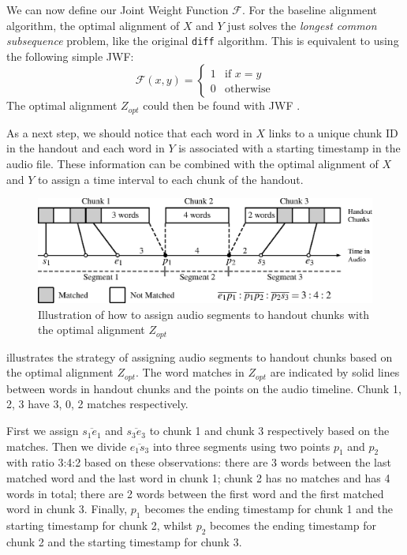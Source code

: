 We can now define our Joint Weight Function $\mathcal{F}$. For the baseline alignment algorithm, the optimal alignment of $X$ and $Y$ just solves the \textit{longest common subsequence} problem, like the original \texttt{diff} algorithm. This is equivalent to using the following simple JWF:
\begin{equation}
  \mathcal{F}(x,y) = 
  \begin{cases}
    1 & \text{if } x = y\\
    0 & \text{otherwise}
  \end{cases}
  \label{eq:jwf-baseline}
\end{equation}
The optimal alignment $Z_{opt}$ could then be found with JWF .

As a next step, we should notice that each word in $X$ links to a unique chunk ID in the handout and each word in $Y$ is associated with a starting timestamp in the audio file. These information can be combined with the optimal alignment of $X$ and $Y$ to assign a time interval to each chunk of the handout.

\begin{figure}[!tb]
  \centering
  \includegraphics[width=.9\textwidth]{align-algo-fig.eps}
  \caption{Illustration of how to assign audio segments to handout chunks with the optimal alignment $Z_{opt}$}
  \label{fig:align-algo-fig}
\end{figure}

 illustrates the strategy of assigning audio segments to handout chunks based on the optimal alignment $Z_{opt}$. The word matches in $Z_{opt}$ are indicated by solid lines between words in handout chunks and the points on the audio timeline. Chunk 1, 2, 3 have 3, 0, 2 matches respectively.

First we assign $\overline{s_1 e_1}$ and $\overline{s_3 e_3}$ to chunk 1 and chunk 3 respectively based on the matches. Then we divide $\overline{e_1 s_3}$ into three segments using two points $p_1$ and $p_2$ with ratio 3:4:2 based on these observations: there are 3 words between the last matched word and the last word in chunk 1; chunk 2 has no matches and has 4 words in total; there are 2 words between the first word and the first matched word in chunk 3. Finally, $p_1$ becomes the ending timestamp for chunk 1 and the starting timestamp for chunk 2, whilst $p_2$ becomes the ending timestamp for chunk 2 and the starting timestamp for chunk 3.


